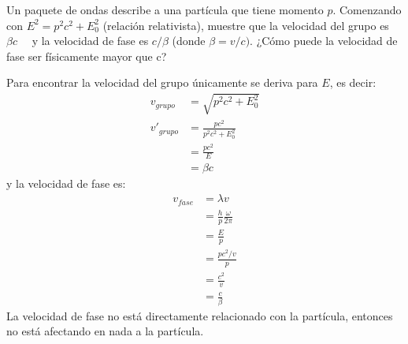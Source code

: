 \begin{problema}
    Un paquete de ondas describe a una partícula que tiene momento $p$. Comenzando con $E^{2}=p^{2} c^{2}+E_{0}^{2}$ (relación relativista), muestre que la velocidad del grupo es $\beta c \quad$ y la velocidad de fase es $c / \beta$ (donde $\beta=v / c)$. ¿Cómo puede la velocidad de fase ser físicamente mayor que c?
    \begin{sol}
        Para encontrar la velocidad del grupo únicamente se deriva para $E$, es decir: 
        \begin{align*}
            v_{grupo} &= \sqrt{p^{2} c^{2}+E_{0}^{2}}\\
            v'_{grupo} &=\frac{pc^2}{p^2c^2+E_0^2}\\
            &= \frac{pc^2}{E}\\
            &= \beta c
        \end{align*}
        y la velocidad de fase es:
        \begin{align*}
            v_{fase} &= \lambda v\\
                     &= \frac{h}{p}\frac{\omega}{2\pi}\\
                     &=\frac{E}{p}\\
                     &= \frac{pc^2/v}{p}\\
                     &= \frac{c^2}{v}\\
                     &= \frac{c}{\beta}
        \end{align*}
        La velocidad de fase no está directamente relacionado con la partícula, entonces no está afectando en nada a la partícula.
    \end{sol}
\end{problema}


